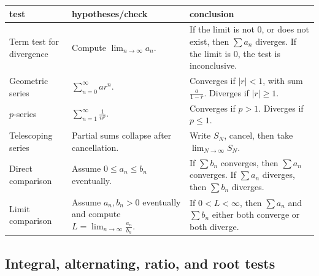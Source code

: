 \begin{center}
\small
\renewcommand{\arraystretch}{2.0}
\begin{tabular}{p{}|p{}|p{}}
\textbf{test} & \textbf{hypotheses/check} & \textbf{conclusion} \\ \hline

Term test for divergence &
Compute \(\displaystyle \lim_{n\to\infty}a_n\). &
If the limit is not \(0\), or does not exist, then \(\sum a_n\) diverges.
If the limit is \(0\), the test is inconclusive. \\

Geometric series &
\(\displaystyle \sum_{n=0}^{\infty} ar^n\). &
Converges if \(|r|<1\), with sum
\(\displaystyle \frac{a}{1-r}\).
Diverges if \(|r|\ge1\). \\

\(p\)-series &
\(\displaystyle \sum_{n=1}^{\infty}\frac1{n^p}\). &
Converges if \(p>1\).  Diverges if \(p\le1\). \\

Telescoping series &
Partial sums collapse after cancellation. &
Write \(S_N\), cancel, then take \(\displaystyle \lim_{N\to\infty}S_N\). \\

Direct comparison &
Assume \(0\le a_n\le b_n\) eventually. &
If \(\sum b_n\) converges, then \(\sum a_n\) converges.
If \(\sum a_n\) diverges, then \(\sum b_n\) diverges. \\

Limit comparison &
Assume \(a_n,b_n>0\) eventually and compute
\(\displaystyle L=\lim_{n\to\infty}\frac{a_n}{b_n}\). &
If \(0<L<\infty\), then \(\sum a_n\) and \(\sum b_n\) either both converge
or both diverge.
\end{tabular}
\end{center}

\subsection{Integral, alternating, ratio, and root tests}
\label{appsubsec:advanced-series-tests-table}

